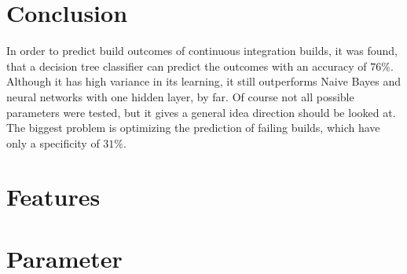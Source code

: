 \documentclass[a4paper,11pt]{article}
\begin{document}
\section{Conclusion}	

In order to predict build outcomes of continuous integration builds, it was found, that a decision tree classifier can predict the outcomes with an accuracy of $76\%$. Although it has high variance in its learning, it still outperforms Naive Bayes and neural networks with one hidden layer, by far. Of course not all possible parameters were tested, but it gives a general idea direction should be looked at. The biggest problem is optimizing the prediction of failing builds, which have only a specificity of $31\%$. 





\appendix

\section{Features}



\section{Parameter}



\end{document}

